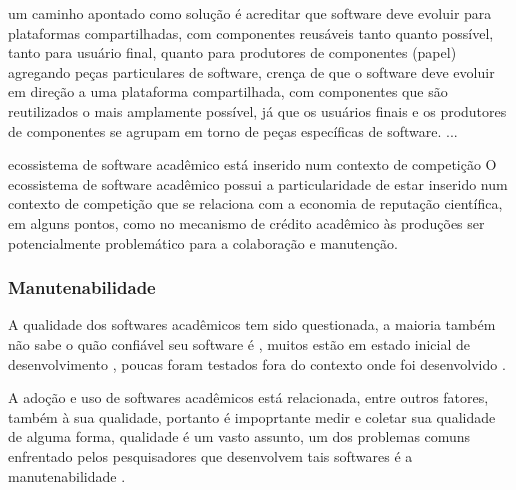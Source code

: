 um caminho apontado como solução é acreditar que software deve evoluir para plataformas compartilhadas,
com componentes reusáveis tanto quanto possível, tanto para usuário final, quanto
para produtores de componentes (papel) agregando peças particulares de software,
crença de que o software deve evoluir em direção a uma plataforma
compartilhada, com componentes que são reutilizados o mais amplamente possível,
já que os usuários finais e os produtores de componentes se agrupam em torno de
peças específicas de software.
...

ecossistema de software acadêmico está inserido num contexto de competição
O ecossistema de software acadêmico possui a particularidade de estar inserido
num contexto de competição que se relaciona com a economia de reputação
científica, em alguns pontos, como no mecanismo de crédito acadêmico às
produções ser potencialmente problemático para a colaboração e manutenção.

\subsubsection{Manutenabilidade}

A qualidade dos softwares acadêmicos tem sido questionada,
a maioria também não sabe o quão confiável seu software é \cite{Merali2010Computational},
muitos estão em estado inicial de desenvolvimento \cite{marshall2013tools},
poucas foram testados fora do contexto onde foi desenvolvido \cite{Portillo12}.

%

A adoção e uso de softwares acadêmicos está relacionada, entre outros fatores,
também à sua qualidade, portanto é impoprtante medir e coletar sua qualidade de
alguma forma, qualidade é um vasto assunto, um dos problemas comuns enfrentado
pelos pesquisadores que desenvolvem tais softwares é a manutenabilidade
\cite{Prlic2012}.

